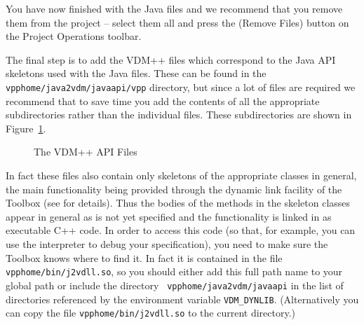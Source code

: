 \documentclass[\pformat,12pt]{article}
\newcommand{\vdmhome}{vpphome}
\newcommand{\guicmd}[1]{{\sf #1}}
\begin{document}
You have now finished with the Java files and we recommend that you
remove them from the project -- select them all and press the 
(\guicmd{Remove Files}) button on the \guicmd{Project Operations}
toolbar.

The final step is to add the VDM++ files which correspond to the Java
API skeletons used with the Java files. These can be found in the {\tt
  \vdmhome/java2vdm/javaapi/vpp} directory, but since a lot of files are
required we recommend that to save time you add the contents of all
the appropriate subdirectories rather than the individual files. These
subdirectories are shown in Figure~\ref{fig:vdmApiFiles}. 

\begin{figure}[tbh]
\begin{center}
\caption{The VDM++ API Files}\label{fig:vdmApiFiles}
\end{center}
\end{figure}

In fact these files also contain only skeletons of the appropriate
classes in general, the main functionality being provided through the
dynamic link facility of the Toolbox (see \cite{DLMan-SCSK} for
details). Thus the bodies of the methods in the skeleton classes
appear in general as \textsf{is not yet specified} and the
functionality is linked in as executable C++ code. In order to access
this code (so that, for example, you can use the interpreter to debug
your specification), you need to make sure the Toolbox knows where to
find it. In fact it is contained in the file {\tt
  \vdmhome/bin/j2vdll.so}, so you should either add this full 
path name to your global path or include the directory {\tt
  \vdmhome/java2vdm/javaapi} in the list of directories referenced by the
environment variable {\tt VDM\_DYNLIB}. (Alternatively you can copy
the file {\tt \vdmhome/bin/j2vdll.so} to the current directory.)
\end{document}

